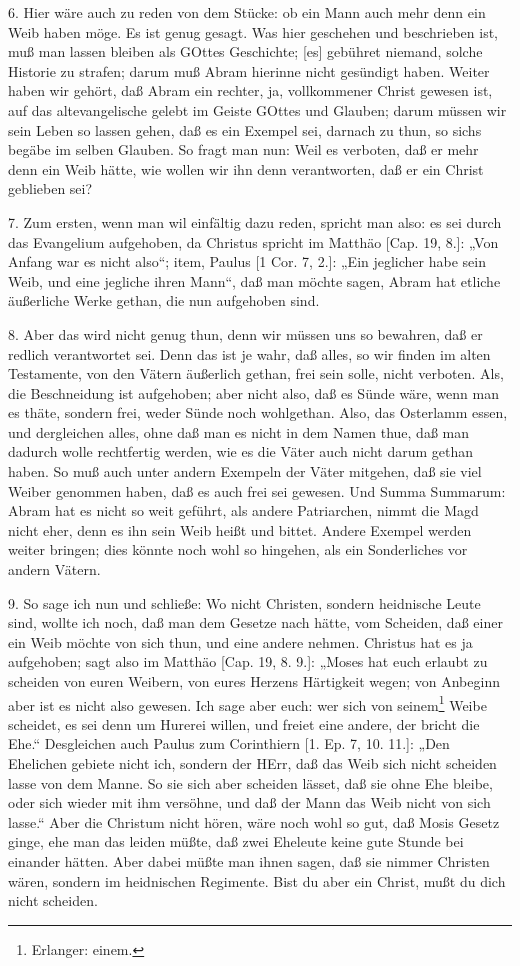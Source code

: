 6. Hier wäre auch zu reden von dem Stücke: ob ein Mann auch mehr denn ein Weib haben möge. Es ist genug gesagt. Was hier geschehen und beschrieben ist, muß man lassen bleiben als GOttes Geschichte; [es] gebühret niemand, solche Historie zu strafen; darum muß Abram hierinne nicht gesündigt haben. Weiter haben wir gehört, daß Abram ein rechter, ja, vollkommener Christ gewesen ist, auf das altevangelische gelebt im Geiste GOttes und Glauben; darum müssen wir sein Leben so lassen gehen, daß es ein Exempel sei, darnach zu thun, so sichs begäbe im selben Glauben. So fragt man nun: Weil es verboten, daß er mehr denn ein Weib hätte, wie wollen wir ihn denn verantworten, daß er ein Christ geblieben sei?

7. Zum ersten, wenn man wil einfältig dazu reden, spricht man also: es sei durch das Evangelium aufgehoben, da Christus spricht im Matthäo [Cap. 19, 8.]: „Von Anfang war es nicht also“; item, Paulus [1 Cor. 7, 2.]: „Ein jeglicher habe sein Weib, und eine jegliche ihren Mann“, daß man möchte sagen, Abram hat etliche äußerliche Werke gethan, die nun aufgehoben sind.

8. Aber das wird nicht genug thun, denn wir müssen uns so bewahren, daß er redlich verantwortet sei. Denn das ist je wahr, daß alles, so wir finden im alten Testamente, von den Vätern äußerlich gethan, frei sein solle, nicht verboten. Als, die Beschneidung ist aufgehoben; aber nicht also, daß es Sünde wäre, wenn man es thäte, sondern frei, weder Sünde noch wohlgethan. Also, das Osterlamm essen, und dergleichen alles, ohne daß man es nicht in dem Namen thue, daß man dadurch wolle rechtfertig
werden, wie es die Väter auch nicht darum gethan haben. So muß auch unter andern Exempeln der Väter mitgehen, daß sie viel Weiber genommen haben, daß es auch frei sei gewesen. Und Summa Summarum: Abram hat es nicht so weit geführt, als andere Patriarchen, nimmt die Magd nicht eher, denn es ihn sein Weib heißt und bittet. Andere Exempel werden weiter bringen; dies könnte noch wohl so hingehen, als ein Sonderliches vor andern Vätern.

9. So sage ich nun und schließe: Wo nicht Christen, sondern heidnische Leute sind, wollte ich noch, daß man dem Gesetze nach hätte, vom Scheiden, daß einer ein Weib möchte von sich thun, und eine andere nehmen. Christus hat es ja aufgehoben; sagt also im Matthäo [Cap. 19, 8. 9.]: „Moses hat euch erlaubt zu scheiden von euren Weibern, von eures Herzens Härtigkeit wegen; von Anbeginn aber ist es nicht also gewesen. Ich sage aber euch: wer sich von seinem\footnote{Erlanger: einem.} Weibe scheidet, es sei denn um Hurerei willen, und freiet eine andere, der bricht die Ehe.“ Desgleichen auch Paulus zum Corinthiern [1. Ep. 7, 10. 11.]: „Den Ehelichen gebiete nicht ich, sondern der HErr, daß das Weib sich nicht scheiden lasse von dem Manne. So sie sich aber scheiden lässet, daß sie ohne Ehe bleibe, oder sich wieder mit ihm versöhne, und daß der Mann das Weib nicht von sich lasse.“ Aber die Christum nicht hören, wäre noch wohl so gut, daß Mosis Gesetz ginge, ehe man das leiden müßte, daß zwei Eheleute keine gute Stunde bei einander hätten. Aber dabei müßte man ihnen sagen, daß sie nimmer Christen wären, sondern im heidnischen Regimente. Bist du aber ein Christ, mußt du dich nicht scheiden.

